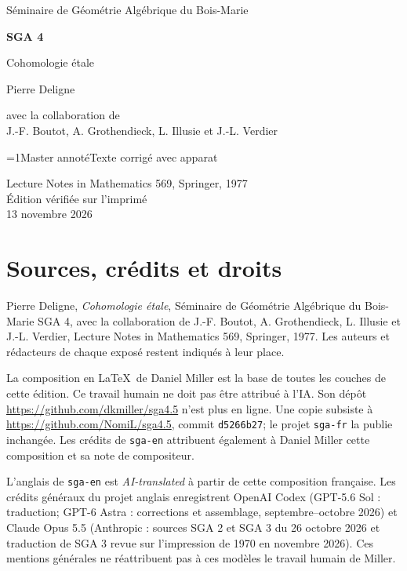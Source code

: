 \documentclass[oneside]{book}
\theoremstyle{sga-source}
\theoremstyle{sga-source-dash}
\theoremstyle{sga-source-dotdash}
\theoremstyle{sga-source-number-note-dash}
\theoremstyle{sga-source-note-number-dotdash}
\theoremstyle{sga-source-example-dotdash}
\theoremstyle{sga-source-inline-number}
\theoremstyle{sga-source-bare-number}
\theoremstyle{sga-source}
\providecommand\EditionIsMaster{1}
\begin{document}
\begin{titlepage}
\centering
\vspace*{2cm}
{\Large Séminaire de Géométrie Algébrique du Bois-Marie\par}
\vspace{0.7cm}
{\Huge\bfseries SGA 4\textonehalf\par}
\vspace{0.8cm}
{\huge Cohomologie étale\par}
\vspace{1cm}
{\Large Pierre Deligne\par}
\vspace{0.5cm}
avec la collaboration de\\[0.3em]
J.-F. Boutot, A. Grothendieck, L. Illusie et J.-L. Verdier
\vfill
{\Large \ifnum\EditionIsMaster=1\relax Master annoté\else Texte corrigé avec apparat\fi\par}
\vspace{0.7cm}
Lecture Notes in Mathematics 569, Springer, 1977\\[0.4em]
Édition vérifiée sur l’imprimé\\
13 novembre 2026
\end{titlepage}

\chapter*{Sources, crédits et droits}
Pierre Deligne, \emph{Cohomologie étale}, Séminaire de Géométrie Algébrique
du Bois-Marie SGA 4\textonehalf, avec la collaboration de J.-F. Boutot,
A. Grothendieck, L. Illusie et J.-L. Verdier, Lecture Notes in Mathematics
569, Springer, 1977. Les auteurs et rédacteurs de chaque exposé restent
indiqués à leur place.

\medskip
La composition en \LaTeX\ de Daniel Miller est la base de toutes les couches
de cette édition. Ce travail humain ne doit pas être attribué à l’IA.
Son dépôt \url{https://github.com/dkmiller/sga4.5} n’est plus en ligne.
Une copie subsiste à \url{https://github.com/NomiL/sga4.5}, commit
\texttt{d5266b27}; le projet \texttt{sga-fr} la publie inchangée.
Les crédits de \texttt{sga-en} attribuent également à Daniel Miller cette
composition et sa note de compositeur.

\medskip
L’anglais de \texttt{sga-en} est \emph{AI-translated} à partir de cette
composition française. Les crédits généraux du projet anglais enregistrent
OpenAI Codex (GPT-5.6 Sol : traduction; GPT-6 Astra : corrections et
assemblage, septembre--octobre 2026) et Claude Opus 5.5 (Anthropic : sources
SGA 2 et SGA 3 du 26 octobre 2026 et traduction de SGA 3 revue sur
l’impression de 1970 en novembre 2026). Ces mentions générales ne
réattribuent pas à ces modèles le travail humain de Miller.
\end{document}
